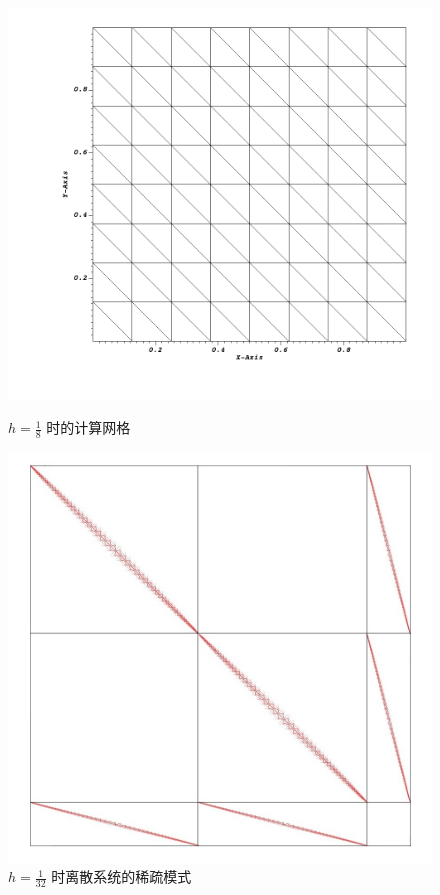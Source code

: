 \documentclass[lang=cn,11pt,a4paper]{elegantpaper}
\begin{document}
\begin{figure}[H]
    \centering
    \begin{minipage}[t]{0.4\textwidth}
        \centering
        \includegraphics[width=\linewidth]{fig/mesh-2D.png}
        \caption{\small $h=\frac{1}{8}$ 时的计算网格}
    \end{minipage}
    \hfill
    \begin{minipage}[t]{0.4\textwidth}
        \centering
        \includegraphics[width=\linewidth]{fig/sparsity-pattern-5.png}
        \caption{\small $h=\frac{1}{32}$ 时离散系统的稀疏模式}
    \end{minipage}
\end{figure}
\end{document}
